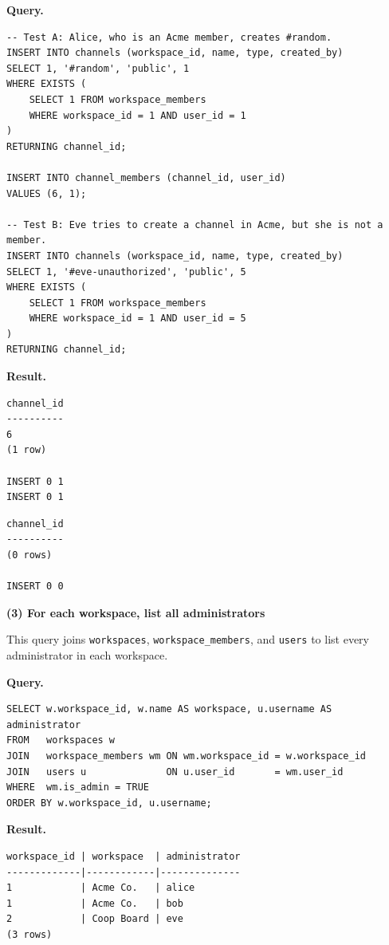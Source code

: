 \documentclass[11pt,letterpaper]{article}
\begin{document}
\noindent\textbf{Query.}
\begin{lstlisting}
-- Test A: Alice, who is an Acme member, creates #random.
INSERT INTO channels (workspace_id, name, type, created_by)
SELECT 1, '#random', 'public', 1
WHERE EXISTS (
    SELECT 1 FROM workspace_members
    WHERE workspace_id = 1 AND user_id = 1
)
RETURNING channel_id;

INSERT INTO channel_members (channel_id, user_id)
VALUES (6, 1);

-- Test B: Eve tries to create a channel in Acme, but she is not a member.
INSERT INTO channels (workspace_id, name, type, created_by)
SELECT 1, '#eve-unauthorized', 'public', 5
WHERE EXISTS (
    SELECT 1 FROM workspace_members
    WHERE workspace_id = 1 AND user_id = 5
)
RETURNING channel_id;
\end{lstlisting}

\noindent\textbf{Result.}

\begin{lstlisting}[style=result]
channel_id
----------
6
(1 row)

INSERT 0 1
INSERT 0 1
\end{lstlisting}

\begin{lstlisting}[style=result]
channel_id
----------
(0 rows)

INSERT 0 0
\end{lstlisting}

\noindent\textbf{(3) For each workspace, list all administrators}

This query joins \texttt{workspaces}, \texttt{workspace\_members}, and
\texttt{users} to list every administrator in each workspace.

\noindent\textbf{Query.}
\begin{lstlisting}
SELECT w.workspace_id, w.name AS workspace, u.username AS administrator
FROM   workspaces w
JOIN   workspace_members wm ON wm.workspace_id = w.workspace_id
JOIN   users u              ON u.user_id       = wm.user_id
WHERE  wm.is_admin = TRUE
ORDER BY w.workspace_id, u.username;
\end{lstlisting}

\noindent\textbf{Result.}
\begin{lstlisting}[style=result]
workspace_id | workspace  | administrator
-------------|------------|--------------
1            | Acme Co.   | alice
1            | Acme Co.   | bob
2            | Coop Board | eve
(3 rows)
\end{lstlisting}
\end{document}
